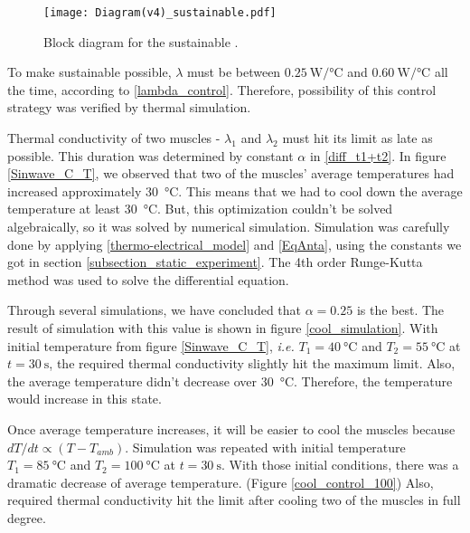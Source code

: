 \begin{figure}[t]
	\centering\texttt{[image: Diagram(v4)\_sustainable.pdf]}
	\caption{Block diagram for the sustainable \apcnospace.}
	\label{diagram_sustainable}
\end{figure}

To make sustainable \apc possible, $\lambda$ must be between $\SI{0.25}{\watt\per\degreeCelsius}$ and $\SI{0.60}{\watt\per\degreeCelsius}$  all the time, according to \eqref{lambda_control}. Therefore, possibility of this control strategy was verified by thermal simulation.

Thermal conductivity of two muscles - $\lambda_{1}$ and $\lambda_{2}$ must hit its limit as late as possible. 
This duration was determined by constant $\alpha$ in \eqref{diff_t1+t2}. 
In figure \ref{Sinwave_C_T}, we observed that two of the muscles' average temperatures had increased approximately \SI{30}{\degreeCelsius}. This means that we had to cool down the average temperature at least \SI{30}{\degreeCelsius}. 
But, this optimization couldn't be solved algebraically, so it was solved by numerical simulation.
Simulation was carefully done by applying \eqref{thermo-electrical_model} and \eqref{EqAnta}, using the constants we got in section \ref{subsection_static_experiment}. The 4th order Runge-Kutta method was used to solve the differential equation. 

Through several simulations, we have concluded that $\alpha = 0.25$ is the best. The result of simulation with this value is shown in figure \ref{cool_simulation}. With initial temperature from figure \ref{Sinwave_C_T}, {\it i.e.} $T_{1}=\SI{40}{\degreeCelsius}$ and $T_{2}=\SI{55}{\degreeCelsius}$ at $t=\SI{30}{\second}$, the required thermal conductivity slightly hit the maximum limit. Also, the average temperature didn't decrease over \SI{30}{\degreeCelsius}. Therefore, the temperature would increase in this state.

Once average temperature increases, it will be easier to cool the muscles because $dT/dt \propto (T-T_{amb})$. Simulation was repeated with initial temperature $T_{1}=\SI{85}{\degreeCelsius}$ and $T_{2}=\SI{100}{\degreeCelsius}$ at $t=\SI{30}{\second}$. With those initial conditions, there was a dramatic decrease of average temperature. (Figure \ref{cool_control_100}) Also, required thermal conductivity hit the limit after cooling two of the muscles in full degree. 

